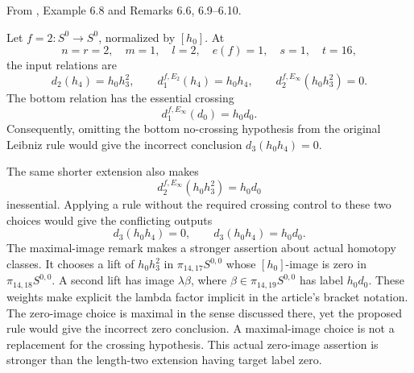 \begin{proposition}
\label{paper:6.8}
\label{paper:6.6}
\label{paper:6.9}
\label{paper:6.10}
\label{exam:Leibnizno}
\label{rem:chuaerror}
From \cite{LWX126}, Example 6.8 and Remarks 6.6, 6.9--6.10.\par
Let $f=2:S^0\to S^0$, normalized by $[h_0]$. At
\[
n=r=2,\quad m=1,\quad l=2,\quad e(f)=1,\quad s=1,\quad t=16,
\]
the input relations are
\[
d_2(h_4)=h_0h_3^2,\qquad
d_1^{f,E_2}(h_4)=h_0h_4,\qquad
d_2^{f,E_\infty}(h_0h_3^2)=0.
\]
The bottom relation has the essential crossing
\[
d_1^{f,E_\infty}(d_0)=h_0d_0.
\]
Consequently, omitting the bottom no-crossing hypothesis from the original Leibniz rule would give the incorrect conclusion $d_3(h_0h_4)=0$.

The same shorter extension also makes
\[
d_2^{f,E_\infty}(h_0h_3^2)=h_0d_0
\]
inessential. Applying a rule without the required crossing control to these two choices would give the conflicting outputs
\[
d_3(h_0h_4)=0,\qquad d_3(h_0h_4)=h_0d_0.
\]
The maximal-image remark makes a stronger assertion about actual
homotopy classes. It chooses a lift of $h_0h_3^2$ in
$\pi_{14,17}S^{0,0}$ whose $[h_0]$-image is zero in
$\pi_{14,18}S^{0,0}$. A second lift has image $\lambda\beta$,
where $\beta\in\pi_{14,19}S^{0,0}$ has label $h_0d_0$.
These weights make explicit the lambda factor implicit in the
article's bracket notation. The zero-image choice is maximal in
the sense discussed there, yet the proposed rule would give the
incorrect zero conclusion. A maximal-image choice is not a
replacement for the crossing hypothesis. This actual zero-image
assertion is stronger than the length-two extension having target
label zero.
\end{proposition}

